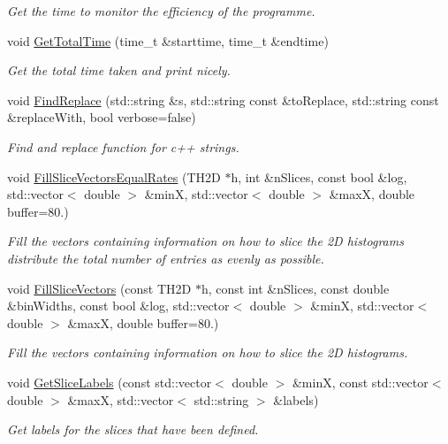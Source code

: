\begin{DoxyCompactItemize}
\begin{DoxyCompactList}\small\item\em Get the time to monitor the efficiency of the programme. \end{DoxyCompactList}\item 
void \hyperlink{namespacecalib_a676d08e0e092c9a8dfdc9cdbd9709fec}{Get\-Total\-Time} (time\-\_\-t \&starttime, time\-\_\-t \&endtime)
\begin{DoxyCompactList}\small\item\em Get the total time taken and print nicely. \end{DoxyCompactList}\item 
void \hyperlink{namespacecalib_acbaccbe06abdfec3dd3f72fee4e5da5c}{Find\-Replace} (std\-::string \&s, std\-::string const \&to\-Replace, std\-::string const \&replace\-With, bool verbose=false)
\begin{DoxyCompactList}\small\item\em Find and replace function for c++ strings. \end{DoxyCompactList}\item 
void \hyperlink{namespacecalib_ab7394e2ac9ddb0399fd7887f91fe3473}{Fill\-Slice\-Vectors\-Equal\-Rates} (T\-H2\-D $\ast$h, int \&n\-Slices, const bool \&log, std\-::vector$<$ double $>$ \&min\-X, std\-::vector$<$ double $>$ \&max\-X, double buffer=80.)
\begin{DoxyCompactList}\small\item\em Fill the vectors containing information on how to slice the 2\-D histograms distribute the total number of entries as evenly as possible. \end{DoxyCompactList}\item 
void \hyperlink{namespacecalib_ae7237c68dfcaaaa495f89fb810364229}{Fill\-Slice\-Vectors} (const T\-H2\-D $\ast$h, const int \&n\-Slices, const double \&bin\-Widths, const bool \&log, std\-::vector$<$ double $>$ \&min\-X, std\-::vector$<$ double $>$ \&max\-X, double buffer=80.)
\begin{DoxyCompactList}\small\item\em Fill the vectors containing information on how to slice the 2\-D histograms. \end{DoxyCompactList}\item 
void \hyperlink{namespacecalib_a5a983ce6a49b9859e49c9d3edb73b60e}{Get\-Slice\-Labels} (const std\-::vector$<$ double $>$ \&min\-X, const std\-::vector$<$ double $>$ \&max\-X, std\-::vector$<$ std\-::string $>$ \&labels)
\begin{DoxyCompactList}\small\item\em Get labels for the slices that have been defined. \end{DoxyCompactList}\item 

\end{DoxyCompactItemize}
